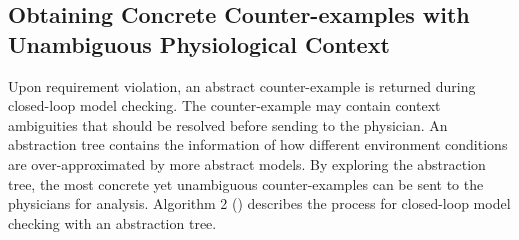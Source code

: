 \subsection{Obtaining Concrete Counter-examples with Unambiguous Physiological Context}
Upon requirement violation, an abstract counter-example is returned during closed-loop model checking. The counter-example may contain context ambiguities that should be resolved before sending to the physician. An abstraction tree contains the information of how different environment conditions are over-approximated by more abstract models. By exploring the abstraction tree, the most concrete yet unambiguous counter-examples can be sent to the physicians for analysis. Algorithm 2 () describes the process for closed-loop model checking with an abstraction tree.

